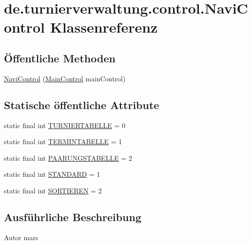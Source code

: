 \hypertarget{classde_1_1turnierverwaltung_1_1control_1_1_navi_control}{}\section{de.\+turnierverwaltung.\+control.\+Navi\+Control Klassenreferenz}
\label{classde_1_1turnierverwaltung_1_1control_1_1_navi_control}
\subsection*{Öffentliche Methoden}
\begin{DoxyCompactItemize}
\item 
\hyperlink{classde_1_1turnierverwaltung_1_1control_1_1_navi_control_aa7ec4c52b98494e9c1bcba5172d80b73}{Navi\+Control} (\hyperlink{classde_1_1turnierverwaltung_1_1control_1_1_main_control}{Main\+Control} main\+Control)
\end{DoxyCompactItemize}
\subsection*{Statische öffentliche Attribute}
\begin{DoxyCompactItemize}
\item 
static final int \hyperlink{classde_1_1turnierverwaltung_1_1control_1_1_navi_control_a1ffa3df67e4e46df8914c34c646b6de3}{T\+U\+R\+N\+I\+E\+R\+T\+A\+B\+E\+L\+LE} = 0
\item 
static final int \hyperlink{classde_1_1turnierverwaltung_1_1control_1_1_navi_control_a5e0a577e40579e6ea34dcd663f92eb25}{T\+E\+R\+M\+I\+N\+T\+A\+B\+E\+L\+LE} = 1
\item 
static final int \hyperlink{classde_1_1turnierverwaltung_1_1control_1_1_navi_control_a517ad01495ae53b4f7f2eecf86ca8579}{P\+A\+A\+R\+U\+N\+G\+S\+T\+A\+B\+E\+L\+LE} = 2
\item 
static final int \hyperlink{classde_1_1turnierverwaltung_1_1control_1_1_navi_control_a465a96de221fe3556de2bba5dca8eb87}{S\+T\+A\+N\+D\+A\+RD} = 1
\item 
static final int \hyperlink{classde_1_1turnierverwaltung_1_1control_1_1_navi_control_a97b3efb0dbd60066532694fb9f1ad202}{S\+O\+R\+T\+I\+E\+R\+EN} = 2
\end{DoxyCompactItemize}


\subsection{Ausführliche Beschreibung}
\begin{DoxyAuthor}{Autor}
mars 
\end{DoxyAuthor}


